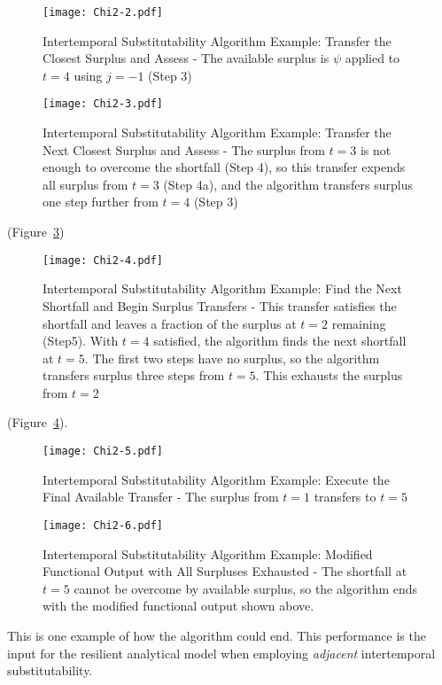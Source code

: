 \begin{figure}[h]
  \centering\texttt{[image: Chi2-2.pdf]}
  \caption{Intertemporal Substitutability Algorithm Example: Transfer
    the Closest Surplus and Assess - The available surplus is $\psi$
    applied to $t=4$ using $j={-1}$ (Step 3)}
  \label{f:Chi2-2}
\end{figure}


\begin{figure}[h]
  \centering\texttt{[image: Chi2-3.pdf]}
  \caption{Intertemporal Substitutability Algorithm Example: Transfer
    the Next Closest Surplus and Assess - The surplus from $t=3$ is
    not enough to overcome the shortfall (Step 4), so this transfer
    expends all surplus from $t=3$ (Step 4a), and the algorithm
    transfers surplus one step further from $t=4$ (Step 3)}
  \label{f:Chi2-3}
\end{figure}


(Figure~\ref{f:Chi2-4})
\begin{figure}[h]
  \centering\texttt{[image: Chi2-4.pdf]}
  \caption{Intertemporal Substitutability Algorithm Example: Find the
    Next Shortfall and Begin Surplus Transfers - This transfer
    satisfies the shortfall and leaves a fraction of the surplus at
    $t=2$ remaining (Step5). With $t=4$ satisfied, the algorithm finds
    the next shortfall at $t=5$. The first two steps have no surplus,
    so the algorithm transfers surplus three steps from $t=5$. This
    exhausts the surplus from $t=2$}
  \label{f:Chi2-4}
\end{figure}
(Figure~\ref{f:Chi2-5}). 
\begin{figure}[h]
  \centering\texttt{[image: Chi2-5.pdf]}
  \caption{Intertemporal Substitutability Algorithm Example: Execute
    the Final Available Transfer - The surplus from $t=1$ transfers to
    $t=5$}
  \label{f:Chi2-5}
\end{figure}



\begin{figure}[h]
  \centering\texttt{[image: Chi2-6.pdf]}
  \caption{Intertemporal Substitutability Algorithm Example: Modified
    Functional Output with All Surpluses Exhausted - The shortfall at
    $t=5$ cannot be overcome by available surplus, so the algorithm
    ends with the modified functional output shown above.}
  \label{f:Chi2-6}
\end{figure}

This is one example of how the algorithm could
end. This performance is the input for the resilient
analytical model when employing \emph{adjacent} intertemporal
substitutability. 

